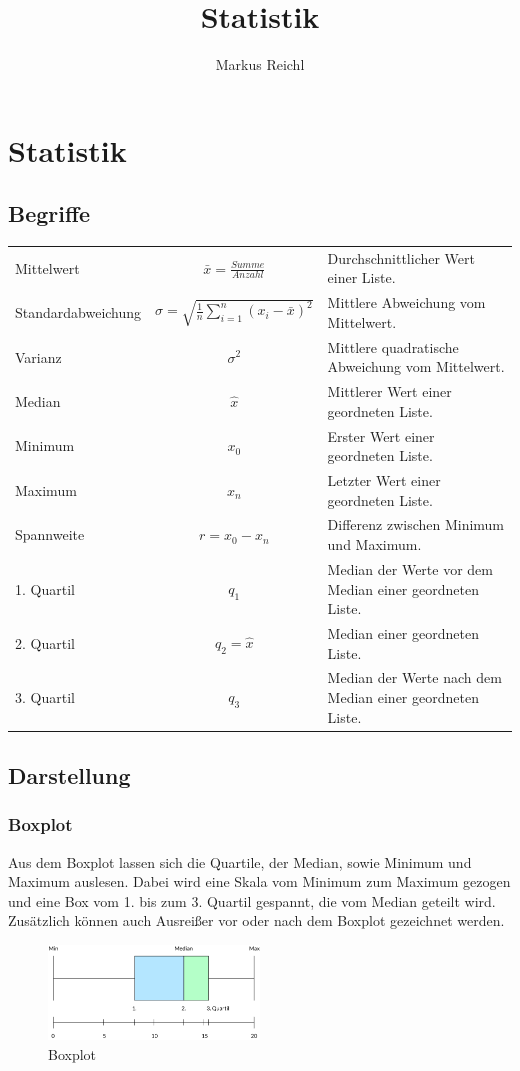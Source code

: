 \documentclass{school}
\title{Statistik}
\author{Markus Reichl}
\begin{document}
\maketitle
\thispagestyle{fancy}	%

\tableofcontents

\section{Statistik}
\subsection{Begriffe}
\begin{tabularx}{\textwidth}{X c l}
Mittelwert & $\bar{x} = \frac{Summe}{Anzahl}$ & \small{Durchschnittlicher Wert einer Liste.}\\
Standardabweichung & $\sigma = \sqrt{\frac{1}{n} \sum_{i=1}^{n} (x_i - \bar{x})^2}$ & \small{Mittlere Abweichung vom Mittelwert.}\\
Varianz & $\sigma^2$ & \small{Mittlere quadratische Abweichung vom Mittelwert.}\\
Median & $\hat{x}$ & \small{Mittlerer Wert einer geordneten Liste.}\\
Minimum & $x_0$ & \small{Erster Wert einer geordneten Liste.}\\
Maximum & $x_n$ & \small{Letzter Wert einer geordneten Liste.}\\
Spannweite & $r = x_0 - x_n$ & \small{Differenz zwischen Minimum und Maximum.}\\
1. Quartil & $q_1$ & \small{Median der Werte vor dem Median einer geordneten Liste.}\\
2. Quartil & $q_2 = \hat{x}$ & \small{Median einer geordneten Liste.}\\
3. Quartil & $q_3$ & \small{Median der Werte nach dem Median einer geordneten Liste.}
\end{tabularx}

\newpage
\subsection{Darstellung}
\subsubsection{Boxplot}
Aus dem Boxplot lassen sich die Quartile, der Median, sowie Minimum und Maximum auslesen. Dabei wird eine Skala vom Minimum zum Maximum gezogen und eine Box vom 1. bis zum 3. Quartil gespannt, die vom Median geteilt wird. Zusätzlich können auch Ausreißer vor oder nach dem Boxplot gezeichnet werden.
\begin{figure}[h]
	\centering
	\includegraphics[width=0.5\textwidth]{boxplot.png}
	\caption{Boxplot}
\end{figure}
\end{document}
